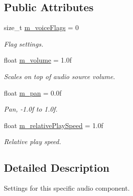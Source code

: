 \subsection*{Public Attributes}
\begin{DoxyCompactItemize}
\item 
\mbox{\label{structrev_1_1_audio_component_settings_a04234b109ecb9a01d0f92245760be02f}} 
size\+\_\+t \mbox{\hyperlink{structrev_1_1_audio_component_settings_a04234b109ecb9a01d0f92245760be02f}{m\+\_\+voice\+Flags}} = 0
\begin{DoxyCompactList}\small\item\em Flag settings. \end{DoxyCompactList}\item 
\mbox{\label{structrev_1_1_audio_component_settings_a3dd60f362df553c816af45d4d12e1d40}} 
float \mbox{\hyperlink{structrev_1_1_audio_component_settings_a3dd60f362df553c816af45d4d12e1d40}{m\+\_\+volume}} = 1.\+0f
\begin{DoxyCompactList}\small\item\em Scales on top of audio source volume. \end{DoxyCompactList}\item 
\mbox{\label{structrev_1_1_audio_component_settings_ae0a70ea98840079795bfffc73f2a92e1}} 
float \mbox{\hyperlink{structrev_1_1_audio_component_settings_ae0a70ea98840079795bfffc73f2a92e1}{m\+\_\+pan}} = 0.\+0f
\begin{DoxyCompactList}\small\item\em Pan, -\/1.\+0f to 1.\+0f. \end{DoxyCompactList}\item 
\mbox{\label{structrev_1_1_audio_component_settings_aea8eb6869902c54490b5d3852c4b66a2}} 
float \mbox{\hyperlink{structrev_1_1_audio_component_settings_aea8eb6869902c54490b5d3852c4b66a2}{m\+\_\+relative\+Play\+Speed}} = 1.\+0f
\begin{DoxyCompactList}\small\item\em Relative play speed. \end{DoxyCompactList}\end{DoxyCompactItemize}


\subsection{Detailed Description}
Settings for this specific audio component. 

